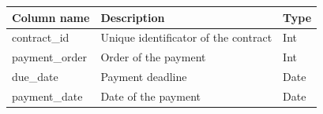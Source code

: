 \documentclass[
]{article}
\begin{document}
\begin{longtable}[]{@{}lll@{}}
\toprule
\begin{minipage}[b]{0.30\columnwidth}\raggedright
Column name\strut
\end{minipage} & \begin{minipage}[b]{0.30\columnwidth}\raggedright
Description\strut
\end{minipage} & \begin{minipage}[b]{0.30\columnwidth}\raggedright
Type\strut
\end{minipage}\tabularnewline
\midrule
\endhead
\begin{minipage}[t]{0.30\columnwidth}\raggedright
contract\_id\strut
\end{minipage} & \begin{minipage}[t]{0.30\columnwidth}\raggedright
Unique identificator of the contract\strut
\end{minipage} & \begin{minipage}[t]{0.30\columnwidth}\raggedright
Int\strut
\end{minipage}\tabularnewline
\begin{minipage}[t]{0.30\columnwidth}\raggedright
payment\_order\strut
\end{minipage} & \begin{minipage}[t]{0.30\columnwidth}\raggedright
Order of the payment\strut
\end{minipage} & \begin{minipage}[t]{0.30\columnwidth}\raggedright
Int\strut
\end{minipage}\tabularnewline
\begin{minipage}[t]{0.30\columnwidth}\raggedright
due\_date\strut
\end{minipage} & \begin{minipage}[t]{0.30\columnwidth}\raggedright
Payment deadline\strut
\end{minipage} & \begin{minipage}[t]{0.30\columnwidth}\raggedright
Date\strut
\end{minipage}\tabularnewline
\begin{minipage}[t]{0.30\columnwidth}\raggedright
payment\_date\strut
\end{minipage} & \begin{minipage}[t]{0.30\columnwidth}\raggedright
Date of the payment\strut
\end{minipage} & \begin{minipage}[t]{0.30\columnwidth}\raggedright
Date\strut
\end{minipage}\tabularnewline

\end{longtable}
\end{document}
